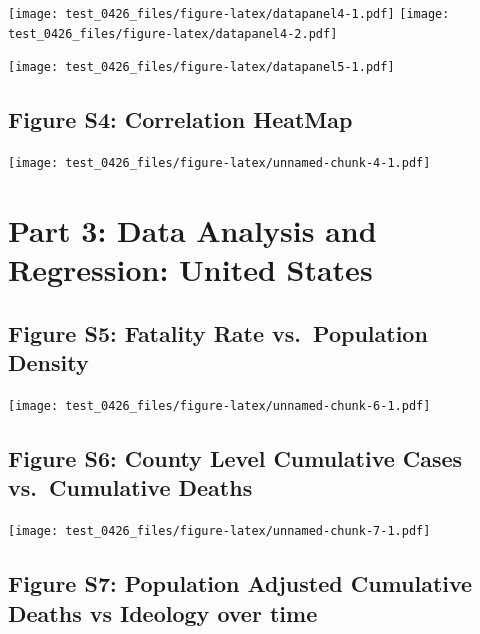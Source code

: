 \documentclass[
]{article}
\begin{document}
\texttt{[image: test\_0426\_files/figure-latex/datapanel4-1.pdf]}
\texttt{[image: test\_0426\_files/figure-latex/datapanel4-2.pdf]}

\newpage

\texttt{[image: test\_0426\_files/figure-latex/datapanel5-1.pdf]}

\newpage

\hypertarget{figure-s4-correlation-heatmap}{%
\subsection{Figure S4: Correlation
HeatMap}\label{figure-s4-correlation-heatmap}}

\texttt{[image: test\_0426\_files/figure-latex/unnamed-chunk-4-1.pdf]}

\newpage

\hypertarget{part-3-data-analysis-and-regression-united-states}{%
\section{Part 3: Data Analysis and Regression: United
States}\label{part-3-data-analysis-and-regression-united-states}}

\hypertarget{figure-s5-fatality-rate-vs.-population-density}{%
\subsection{Figure S5: Fatality Rate vs.~Population
Density}\label{figure-s5-fatality-rate-vs.-population-density}}

\texttt{[image: test\_0426\_files/figure-latex/unnamed-chunk-6-1.pdf]}

\hypertarget{figure-s6-county-level-cumulative-cases-vs.-cumulative-deaths}{%
\subsection{Figure S6: County Level Cumulative Cases vs.~Cumulative
Deaths}\label{figure-s6-county-level-cumulative-cases-vs.-cumulative-deaths}}

\texttt{[image: test\_0426\_files/figure-latex/unnamed-chunk-7-1.pdf]}

\hypertarget{figure-s7-population-adjusted-cumulative-deaths-vs-ideology-over-time}{%
\subsection{Figure S7: Population Adjusted Cumulative Deaths vs Ideology
over
time}\label{figure-s7-population-adjusted-cumulative-deaths-vs-ideology-over-time}}
\end{document}
